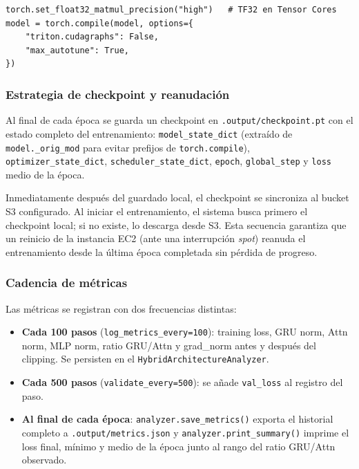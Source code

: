 \begin{verbatim}
torch.set_float32_matmul_precision("high")   # TF32 en Tensor Cores
model = torch.compile(model, options={
    "triton.cudagraphs": False,
    "max_autotune": True,
})
\end{verbatim}

\subsubsection*{Estrategia de checkpoint y reanudación}

Al final de cada época se guarda un checkpoint en \texttt{.output/checkpoint.pt} con el estado completo del entrenamiento: \texttt{model\_state\_dict} (extraído de \texttt{model.\_orig\_mod} para evitar prefijos de \texttt{torch.compile}), \texttt{optimizer\_state\_dict}, \texttt{scheduler\_state\_dict}, \texttt{epoch}, \texttt{global\_step} y \texttt{loss} medio de la época.

Inmediatamente después del guardado local, el checkpoint se sincroniza al bucket S3 configurado. Al iniciar el entrenamiento, el sistema busca primero el checkpoint local; si no existe, lo descarga desde S3. Esta secuencia garantiza que un reinicio de la instancia EC2 (ante una interrupción \textit{spot}) reanuda el entrenamiento desde la última época completada sin pérdida de progreso.

\subsubsection*{Cadencia de métricas}

Las métricas se registran con dos frecuencias distintas:

\begin{itemize}
    \item \textbf{Cada 100 pasos} (\texttt{log\_metrics\_every=100}): training loss, GRU norm, Attn norm, MLP norm, ratio GRU/Attn y grad\_norm antes y después del clipping. Se persisten en el \texttt{HybridArchitectureAnalyzer}.
    \item \textbf{Cada 500 pasos} (\texttt{validate\_every=500}): se añade \texttt{val\_loss} al registro del paso.
    \item \textbf{Al final de cada época}: \texttt{analyzer.save\_metrics()} exporta el historial completo a \texttt{.output/metrics.json} y \texttt{analyzer.print\_summary()} imprime el loss final, mínimo y medio de la época junto al rango del ratio GRU/Attn observado.
\end{itemize}

